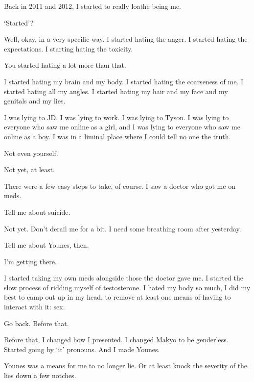 \begin{paracol}{2}
  \begin{leftcolumn}

\noindent Back in 2011 and 2012, I started to really loathe being me.

\begin{ally}
`Started'?
\end{ally}
Well, okay, in a very specific way. I started hating the anger. I started hating the expectations. I starting hating the toxicity.

\begin{ally}
You started hating a lot more than that.
\end{ally}
I started hating my brain and my body. I started hating the coarseness of me. I started hating all my angles. I started hating my hair and my face and my genitals and my lies.

I was lying to JD. I was lying to work. I was lying to Tyson. I was lying to everyone who saw me online as a girl, and I was lying to everyone who saw me online as a boy. I was in a liminal place where I could tell no one the truth.

\begin{ally}
Not even yourself.
\end{ally}
Not yet, at least.

There were a few easy steps to take, of course. I saw a doctor who got me on meds.

\begin{ally}
Tell me about suicide.
\end{ally}
Not yet. Don't derail me for a bit. I need some breathing room after yesterday.

\begin{ally}
Tell me about Younes, then.
\end{ally}
I'm getting there.

I started taking my own meds alongside those the doctor gave me. I started the slow process of ridding myself of testosterone. I hated my body so much, I did my best to camp out up in my head, to remove at least one means of having to interact with it: sex.

\begin{ally}
Go back. Before that.
\end{ally}
Before that, I changed how I presented. I changed Makyo to be genderless. Started going by `it' pronouns. And I made Younes.

Younes was a means for me to no longer lie. Or at least knock the severity of the lies down a few notches.


\end{leftcolumn}
\end{paracol}
